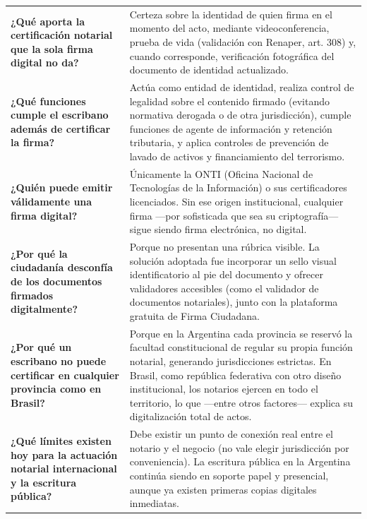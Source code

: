 \documentclass[12pt,oneside]{book}
\begin{document}
\begin{longtable}{
    >{\raggedright\arraybackslash}p{}
    >{\raggedright\arraybackslash}p{}
}
\textbf{¿Qué aporta la certificación notarial que la sola firma digital no da?} &
Certeza sobre la identidad de quien firma en el momento del acto, mediante videoconferencia, prueba de vida (validación con Renaper, art. 308) y, cuando corresponde, verificación fotográfica del documento de identidad actualizado. \\
\addlinespace

\textbf{¿Qué funciones cumple el escribano además de certificar la firma?} &
Actúa como entidad de identidad, realiza control de legalidad sobre el contenido firmado (evitando normativa derogada o de otra jurisdicción), cumple funciones de agente de información y retención tributaria, y aplica controles de prevención de lavado de activos y financiamiento del terrorismo. \\
\addlinespace

\textbf{¿Quién puede emitir válidamente una firma digital?} &
Únicamente la ONTI (Oficina Nacional de Tecnologías de la Información) o sus certificadores licenciados. Sin ese origen institucional, cualquier firma ---por sofisticada que sea su criptografía--- sigue siendo firma electrónica, no digital. \\
\addlinespace

\textbf{¿Por qué la ciudadanía desconfía de los documentos firmados digitalmente?} &
Porque no presentan una rúbrica visible. La solución adoptada fue incorporar un sello visual identificatorio al pie del documento y ofrecer validadores accesibles (como el validador de documentos notariales), junto con la plataforma gratuita de Firma Ciudadana. \\
\addlinespace

\textbf{¿Por qué un escribano no puede certificar en cualquier provincia como en Brasil?} &
Porque en la Argentina cada provincia se reservó la facultad constitucional de regular su propia función notarial, generando jurisdicciones estrictas. En Brasil, como república federativa con otro diseño institucional, los notarios ejercen en todo el territorio, lo que ---entre otros factores--- explica su digitalización total de actos. \\
\addlinespace

\textbf{¿Qué límites existen hoy para la actuación notarial internacional y la escritura pública?} &
Debe existir un punto de conexión real entre el notario y el negocio (no vale elegir jurisdicción por conveniencia). La escritura pública en la Argentina continúa siendo en soporte papel y presencial, aunque ya existen primeras copias digitales inmediatas. \\
\midrule


\end{longtable}
\end{document}

